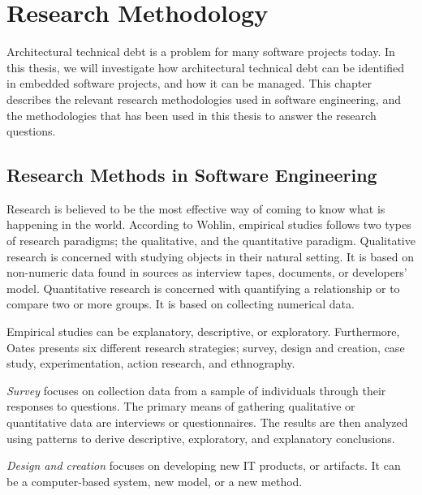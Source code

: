
\chapter{Research Methodology}
Architectural technical debt is a problem for many software projects today. In this thesis, we will investigate how architectural technical debt can be identified in embedded software projects, and how it can be managed. This chapter describes the relevant research methodologies used in software engineering, and the methodologies that has been used in this thesis to answer the research questions. 



\section{Research Methods in Software Engineering}
Research is believed to be the most effective way of coming to know what is happening in the world\cite{bassey2003case}. According to Wohlin\cite{Wohlin:2000:ESE:330775}, empirical studies follows two types of research paradigms; the qualitative, and the quantitative paradigm. Qualitative research is concerned with studying objects in their natural setting\cite{Wohlin:2000:ESE:330775}. It is based on non-numeric data found in sources as interview tapes, documents, or developers' model. Quantitative research is concerned with quantifying a relationship or to compare two or more groups\cite{Wohlin:2000:ESE:330775}. It is based on collecting numerical data. 



Empirical studies can be explanatory, descriptive, or exploratory. Furthermore, Oates\cite{Oates:2006:RIS:1202299} presents six different research strategies; survey, design and creation, case study, experimentation, action research, and ethnography. 

\textit{{Survey}} focuses on collection data from a sample of individuals through their responses to questions. The primary means of gathering qualitative or quantitative data are interviews or questionnaires. The results are then analyzed using patterns to derive descriptive, exploratory, and explanatory conclusions. 

\textit{{Design and creation}} focuses on developing new IT products, or artifacts. It can be a computer-based system, new model, or a new method. 

